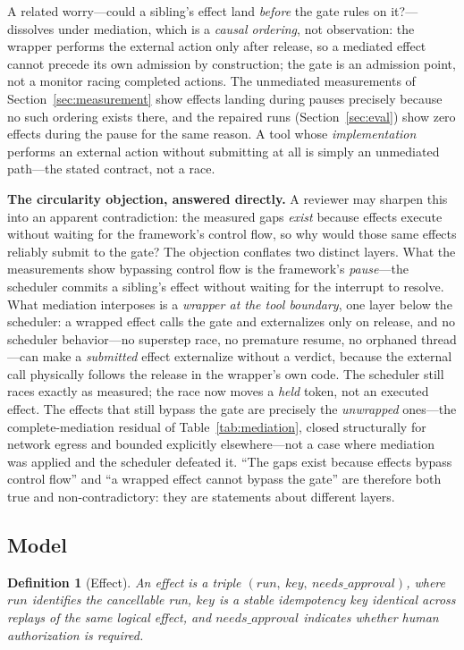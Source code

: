 \documentclass[10pt,journal,compsoc]{IEEEtran}
\newtheorem{definition}{Definition}
\begin{document}
\smallskip\noindent
A related worry---could a sibling's effect land \emph{before} the gate rules
on it?---dissolves under mediation, which is a \emph{causal ordering}, not
observation: the wrapper performs the external action only after
\textsf{release}, so a mediated effect cannot precede its own admission by
construction; the gate is an admission point, not a monitor racing completed
actions. The unmediated measurements of Section~\ref{sec:measurement} show
effects landing during pauses precisely because no such ordering exists
there, and the repaired runs (Section~\ref{sec:eval}) show zero effects
during the pause for the same reason. A tool whose \emph{implementation}
performs an external action without submitting at all is simply an
unmediated path---the stated contract, not a race.

\smallskip\noindent\textbf{The circularity objection, answered directly.} A
reviewer may sharpen this into an apparent contradiction: the measured gaps
\emph{exist} because effects execute without waiting for the framework's
control flow, so why would those same effects reliably submit to the gate?
The objection conflates two distinct layers. What the measurements show
bypassing control flow is the framework's \emph{pause}---the scheduler
commits a sibling's effect without waiting for the interrupt to resolve. What
mediation interposes is a \emph{wrapper at the tool boundary}, one layer below
the scheduler: a wrapped effect calls the gate and externalizes only on
\textsf{release}, and no scheduler behavior---no superstep race, no premature
resume, no orphaned thread---can make a \emph{submitted} effect externalize
without a verdict, because the external call physically follows the release in
the wrapper's own code. The scheduler still races exactly as measured; the
race now moves a \emph{held} token, not an executed effect. The effects that
still bypass the gate are precisely the \emph{unwrapped} ones---the
complete-mediation residual of Table~\ref{tab:mediation}, closed structurally
for network egress and bounded explicitly elsewhere---not a case where
mediation was applied and the scheduler defeated it. ``The gaps exist because
effects bypass control flow'' and ``a wrapped effect cannot bypass the gate''
are therefore both true and non-contradictory: they are statements about
different layers.

\subsection{Model}
\begin{definition}[Effect]
An effect is a triple $(\mathit{run},\ \mathit{key},\ \mathit{needs\_approval})$,
where $\mathit{run}$ identifies the cancellable run, $\mathit{key}$ is a stable
idempotency key identical across replays of the same logical effect, and
$\mathit{needs\_approval}$ indicates whether human authorization is required.
\end{definition}
\end{document}
